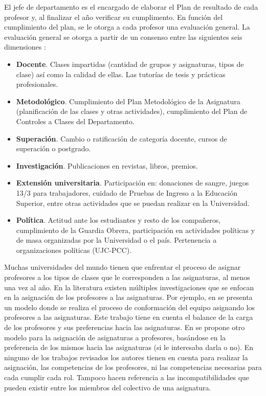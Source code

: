 El jefe de departamento es el encargado de elaborar el Plan de resultado de cada profesor y, al finalizar el año verificar su cumplimento. En función del cumplimiento del plan, se le otorga a cada profesor una evaluación general. La evaluación general se otorga a partir de un consenso entre las siguientes seis dimensiones \citep{Ansola2020}:
\begin{itemize}
	\item \textbf{Docente}. Clases impartidas (cantidad de grupos y asignaturas, tipos de clase) así como la calidad de ellas. Las tutorías de tesis y prácticas profesionales.
	\item \textbf{Metodológico}. Cumplimiento del Plan Metodológico de la Asignatura (planificación de las clases y otras actividades), cumplimiento del Plan de Controles a Clases del Departamento.
	\item \textbf{Superación}. Cambio o ratificación de categoría docente, cursos de superación o postgrado.
	\item \textbf{Investigación}. Publicaciones en revistas, libros, premios.
	\item \textbf{Extensión universitaria}. Participación en: donaciones de sangre, juegos 13/3 para trabajadores, cuidado de Pruebas de Ingreso a la Educación Superior, entre otras actividades que se puedan realizar en la Universidad.
	\item \textbf{Política}. Actitud ante los estudiantes y resto de los compañeros, cumplimiento de la Guardia Obrera, participación en actividades políticas y de masa organizadas por la Universidad o el país. Pertenencia a organizaciones políticas (UJC-PCC).
\end{itemize}

Muchas universidades del mundo tienen que enfrentar el proceso de asignar profesores a los tipos de clases que le corresponden a las asignaturas, al menos una vez al año. En la literatura existen múltiples investigaciones que se enfocan en la asignación de los profesores a las asignaturas. Por ejemplo, en \cite{Domenech2014} se presenta un modelo donde se realiza el proceso de conformación del equipo asignando los profesores a las asignaturas. Este trabajo tiene en cuenta el balance de la carga de los profesores y sus preferencias hacia las asignaturas. En \cite{Bosquez2020} se propone otro modelo para la asignación de asignaturas a profesores, basándose en la preferencia de los mismos hacia las asignaturas (si le interesaba darla o no). En ninguno de los trabajos revisados los autores tienen en cuenta para realizar la asignación, las competencias de los profesores, ni las competencias necesarias para cada cumplir cada rol. Tampoco hacen referencia a las incompatibilidades que pueden existir entre los miembros del colectivo de una asignatura.

